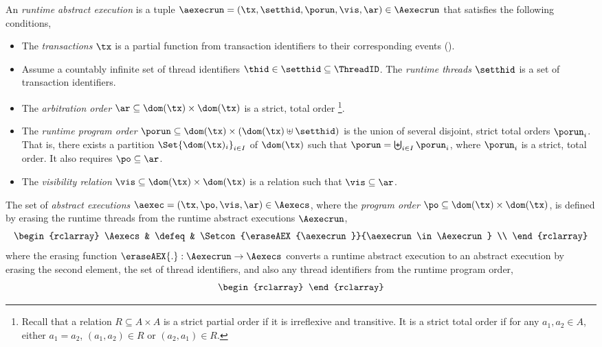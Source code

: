 \begin{defn}
\label{def:run-abs-exec}
\label{def:abs-exec}
An \emph{runtime abstract execution} is a tuple \( \aexecrun = (\tx, \setthid, \porun, \vis, \ar) \in \Aexecrun \) that satisfies the following conditions,
\begin{itemize}
\item
The \emph{transactions} \( \tx \) is a partial function from transaction identifiers to their corresponding events ().
\item 
Assume a countably infinite set of thread identifiers \( \thid \in \setthid \subseteq \ThreadID \). 
The \emph{runtime threads} \( \setthid \) is a set of transaction identifiers.
\item 
The \emph{arbitration order} $\ar \subseteq \dom(\tx) \times \dom(\tx)$ is a strict, total order%
\footnote{Recall that a relation $R \subseteq A \times A$ is a strict partial order if it is irreflexive and transitive.
It is a strict total order if for any $a_1, a_2 \in A$, either $a_1 = a_2$, $(a_1, a_2) \in R$ or $(a_2, a_1) \in R$.}.
\item 
The \emph{runtime program order} $\porun \subseteq \dom(\tx) \times ( \dom(\tx) \uplus \setthid )$ is the union of several disjoint, strict total orders \( \porun_{i} \).
That is, there exists a partition $\Set{ \dom(\tx)_{i} }_{i \in I}$ of $\dom(\tx)$ such that $\porun = \biguplus_{i \in I} \porun_{i}$, where $\porun_{i}$ is a strict, total order.
It also requires \( \po \subseteq \ar\).
\item 
The \emph{visibility relation} $\vis \subseteq \dom(\tx) \times \dom(\tx)$ is a relation such that \( \vis \subseteq \ar \).
\end{itemize} 
The set of \emph{abstract executions} $\aexec  = (\tx, \po, \vis, \ar) \in \Aexecs$, where the \emph{program order} \( \po \subseteq \dom(\tx) \times \dom(\tx)\), is defined by erasing the runtime threads from the runtime abstract executions \( \Aexecrun \),
\[
\begin{rclarray}
    \Aexecs & \defeq & \Setcon{\eraseAEX{\aexecrun}}{\aexecrun \in \Aexecrun} \\
\end{rclarray} 
\]
where the erasing function \( \eraseAEX{.}: \Aexecrun \to \Aexecs \) converts a runtime abstract execution to an abstract execution by erasing the second element, \ie the set of thread identifiers, and also any thread identifiers from the runtime program order,
\[
    \begin{rclarray}

\end{rclarray}\]
\end{defn}
